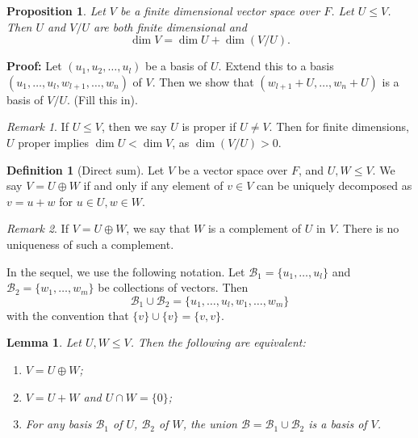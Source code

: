 \documentclass[12pt]{article}
\newtheorem{lemma}{Lemma}[section]
\newtheorem{proposition}{Proposition}[section]
\theoremstyle{definition}
\newtheorem{definition}{Definition}[section]
\theoremstyle{remark}
\newtheorem*{remark}{Remark}
\begin{document}
\begin{proposition}
	Let $V$ be a finite dimensional vector space over $F$. Let $U \leq V$. Then $U$ and $V/U$ are both finite dimensional and
	\[
		\dim V = \dim U + \dim(V/U)
	.\]
\end{proposition}

\begin{adjustbox}{minipage = \columnwidth - 25.5pt, margin=1em, frame=1pt, margin=0em}
	\textbf{Proof:} Let $(u_1, u_2, \ldots, u_l)$ be a basis of $U$. Extend this to a basis $(u_1, \ldots, u_l, w_{l+1}, \ldots, w_{n})$ of $V$. Then we show that $(w_{l+1} + U, \ldots, w_{n} + U)$ is a basis of $V/U$. (Fill this in).
\end{adjustbox}

\begin{remark}
	If $U \leq V$, then we say $U$ is proper if $U \neq V$. Then for finite dimensions, $U$ proper implies $\dim U < \dim V$, as $\dim(V/U) > 0$.
\end{remark}

\begin{definition}[Direct sum]
	Let $V$ be a vector space over $F$, and $U, W \leq V$. We say $V = U \oplus W$ if and only if any element of $v \in V$ can be uniquely decomposed as $v = u + w$ for $u \in U, w \in W$.
\end{definition}

\begin{remark}
	If $V = U \oplus W$, we say that $W$ is a complement of $U$ in $V$. There is no uniqueness of such a complement.
\end{remark}

In the sequel, we use the following notation. Let $\mathcal{B}_1 = \{u_1, \ldots, u_l\}$ and $\mathcal{B}_2 = \{w_1, \ldots, w_m\}$ be collections of vectors. Then
\[
	\mathcal{B}_1 \cup \mathcal{B}_2 = \{u_1, \ldots, u_l, w_1, \ldots, w_m\}
\]
with the convention that $\{v\} \cup \{v\} = \{v, v\}$.

\begin{lemma}
	Let $U, W \leq V$. Then the following are equivalent:
	\begin{enumerate}[\normalfont(i)]
		\item $V = U \oplus W$;
		\item $V = U + W$ and $U \cap W = \{0\}$;
		\item For any basis $\mathcal{B}_1$ of $U$, $\mathcal{B}_2$ of $W$, the union $\mathcal{B} = \mathcal{B}_1 \cup \mathcal{B}_2$ is a basis of $V$.
	\end{enumerate}
\end{lemma}
\end{document}
